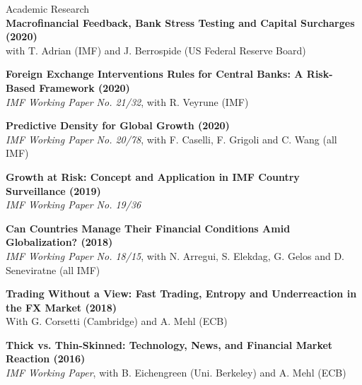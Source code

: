 \documentclass[usegeometry, 10pt, a4paper]{cv} %
\newcommand{\activite}[1]{\textbf{#1}\ }
\begin{document}
\begin{rubriquetableau}[0.95\textwidth]{Academic Research}\\

\activite{Macrofinancial Feedback, Bank Stress Testing and Capital Surcharges (2020)} \\
\hspace{0.6cm} \small{with T. Adrian (IMF) and J. Berrospide (US Federal Reserve Board)}
\vspace{0.4cm} 
  
\activite{Foreign Exchange Interventions Rules for Central Banks: A Risk-Based Framework (2020)} \\
\hspace{0.6cm} \small{\emph{IMF Working Paper No. 21/32}, with R. Veyrune (IMF)}
\vspace{0.4cm} 
  

\activite{Predictive Density for Global Growth (2020)} \\
\hspace{0.6cm} \small{\emph{IMF Working Paper No. 20/78}, with F. Caselli, F. Grigoli and C. Wang (all IMF)}
\vspace{0.4cm} 

  
\activite{Growth at Risk: Concept and Application in IMF Country Surveillance (2019)} \\
\hspace{0.6cm} \small{\emph{IMF Working Paper No. 19/36}}
\vspace{0.4cm} 

\activite{Can Countries Manage Their Financial Conditions Amid Globalization? (2018)} \\
\hspace{0.6cm} \small{\emph{IMF Working Paper No. 18/15}, with N. Arregui, S. Elekdag, G. Gelos and D. Seneviratne (all IMF)}
\vspace{0.4cm} 

\activite{Trading Without a View: Fast Trading, Entropy and Underreaction in the FX  Market (2018)} \\
\hspace{0.6cm} \small{With G. Corsetti (Cambridge) and A. Mehl (ECB)}
\vspace{0.4cm} 


\activite{Thick vs. Thin-Skinned: Technology, News, and Financial Market Reaction (2016)} \\
\hspace{0.6cm} \small{\emph{IMF Working Paper}, with B. Eichengreen (Uni. Berkeley) and A. Mehl (ECB)}
\vspace{0.4cm} 


\end{rubriquetableau}
\end{document}
